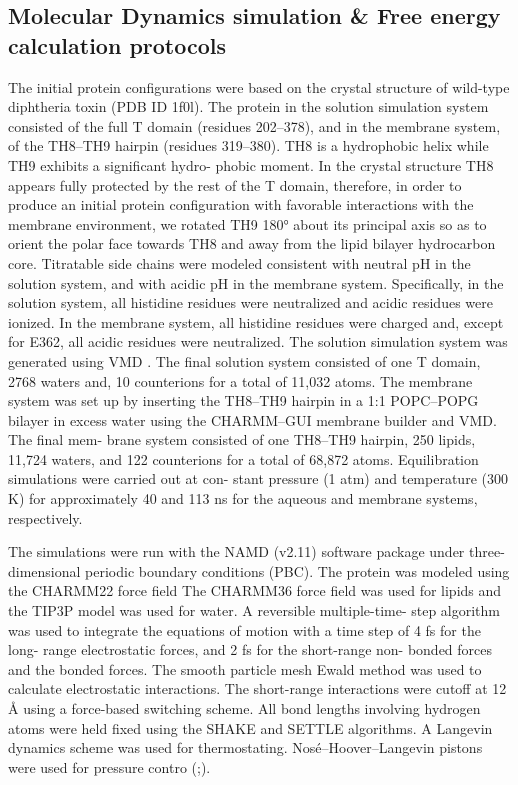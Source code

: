 \subsection{Molecular Dynamics simulation \& Free energy calculation protocols}
The initial protein configurations were based on the crystal structure of wild-type diphtheria toxin (PDB ID 1f0l). 
The protein in the solution simulation system consisted of the full T domain (residues 202–378), and in the membrane system, of the TH8–TH9 hairpin (residues 319–380). 
TH8 is a hydrophobic helix while TH9 exhibits a significant hydro- phobic moment. 
In the crystal structure TH8 appears fully protected by the rest of the T domain, therefore, in order to produce an initial protein configuration with favorable interactions with the membrane environment, we rotated TH9 180° about its principal axis so as to orient the polar face towards TH8 and away from the lipid bilayer hydrocarbon core.
Titratable side chains were modeled consistent with neutral pH in the solution system, and with acidic pH in the membrane system. 
Specifically, in the solution system, all histidine residues were neutralized and acidic residues were ionized. 
In the membrane system, all histidine residues were charged and, except for E362, all acidic residues were neutralized. 
The solution simulation system was generated using VMD \cite{humphrey1996vmd}. 
The final solution system consisted of one T domain, 2768 waters and, 10 counterions for a total of 11,032 atoms. 
The membrane system was set up by inserting the TH8–TH9 hairpin in a 1:1 POPC–POPG bilayer in excess water using the CHARMM–GUI membrane builder \cite{jo2009charmm} and VMD. 
The final mem- brane system consisted of one TH8–TH9 hairpin, 250 lipids, 11,724 waters, and 122 counterions for a total of 68,872 atoms. 
Equilibration simulations were carried out at con- stant pressure (1 atm) and temperature (300 K) for approximately 40 and 113 ns for the aqueous and membrane systems, respectively.

The simulations were run with the NAMD (v2.11) software package \cite{phillips2005scalable} under three-dimensional periodic boundary conditions (PBC). 
The protein was modeled using the CHARMM22 force field \cite{mackerell1998all}
The CHARMM36 force field was used for lipids \cite{klauda2010update} and the TIP3P \cite{jorgensen1983comparison} model was used for water. 
A reversible multiple-time- step algorithm \cite{grubmuller1991generalized} was used to integrate the equations of motion with a time step of 4 fs for the long- range electrostatic forces, and 2 fs for the short-range non- bonded forces and the bonded forces. 
The smooth particle mesh Ewald method \cite{essmann1995smooth} was used to calculate electrostatic interactions. 
The short-range interactions were cutoff at 12 Å using a force-based switching scheme.
All bond lengths involving hydrogen atoms were held fixed using the SHAKE \cite{ryckaert1977numerical} and SETTLE \cite{miyamoto1992settle} algorithms. 
A Langevin dynamics scheme was used for thermostating. Nosé–Hoover–Langevin pistons were used for pressure contro (\cite{feller1995constant};\cite{martyna1994constant}).

